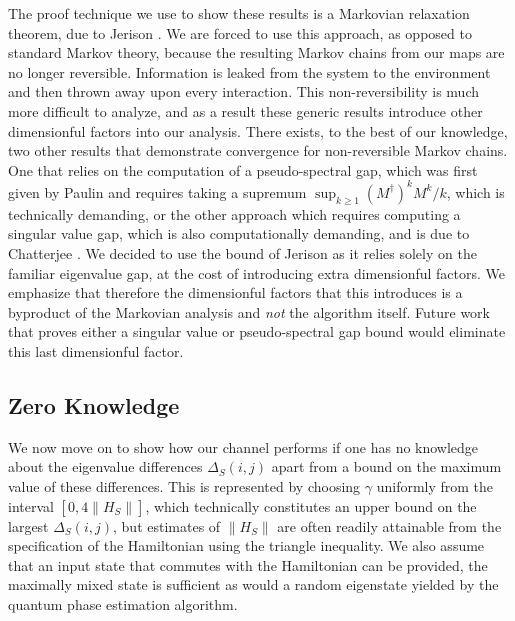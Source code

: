\documentclass[
 amsmath,amssymb,
 aps,
onecolumn, 
nofootinbib]{revtex4-2}
\newcommand{\norm}[1]{\left\| #1 \right\|}
\begin{document}
The proof technique we use to show these results is a Markovian relaxation theorem, due to Jerison \cite{jerison2013general}. We are forced to use this approach, as opposed to standard Markov theory, because the resulting Markov chains from our maps are no longer reversible. Information is leaked from the system to the environment and then thrown away upon every interaction. This non-reversibility is much more difficult to analyze, and as a result these generic results introduce other dimensionful factors into our analysis. There exists, to the best of our knowledge, two other results that demonstrate convergence for non-reversible Markov chains. One that relies on the computation of a pseudo-spectral gap, which was first given by Paulin \cite{paulin2018concentrationinequalitiesmarkovchains} and requires taking a supremum $\sup_{k \ge 1} (M^\dagger )^k M^k / k$, which is technically demanding, or the other approach which requires computing a singular value gap, which is also computationally demanding, and is due to Chatterjee \cite{chatterjee2025spectral}. We decided to use the bound of Jerison \cite{jerison2013general} as it relies solely on the familiar eigenvalue gap, at the cost of introducing extra dimensionful factors. We emphasize that therefore the dimensionful factors that this introduces is a byproduct of the Markovian analysis and \emph{not} the algorithm itself. Future work that proves either a singular value or pseudo-spectral gap bound would eliminate this last dimensionful factor.

\subsection{Zero Knowledge} \label{sec:zero_knowledge}
We now move on to show how our channel performs if one has no knowledge about the eigenvalue differences $\Delta_S(i,j)$ apart from a bound on the maximum value of these differences. This is represented by choosing $\gamma$ uniformly from the interval $[0, 4 \norm{H_S}]$, which technically constitutes an upper bound on the largest $\Delta_S(i,j)$, but estimates of $\norm{H_S}$ are often readily attainable from the specification of the Hamiltonian using the triangle inequality.  We also assume that an input state that commutes with the Hamiltonian can be provided, the maximally mixed state is sufficient as would a random eigenstate yielded by the quantum phase estimation algorithm.
\end{document}
